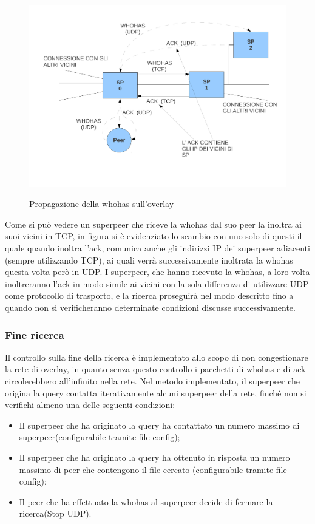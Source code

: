 \begin{figure}[htpb]
\centering
{\includegraphics[width=12cm]{img/whhs_sull_overlay}}
\caption{Propagazione della whohas sull'overlay\label{whhs_overlay}}
\end{figure}



Come si può vedere un superpeer che riceve la whohas dal suo peer la inoltra ai suoi vicini in TCP, in figura si è evidenziato lo scambio con uno solo di questi il quale quando inoltra l'ack, comunica anche gli indirizzi IP dei superpeer adiacenti (sempre utilizzando TCP), ai quali verrà successivamente inoltrata la whohas questa volta però in UDP.\linebreak
I superpeer, che hanno ricevuto la whohas, a loro volta inoltreranno l'ack in modo simile ai vicini con la sola differenza di utilizzare UDP come protocollo di trasporto, e la ricerca proseguirà nel modo descritto fino a quando non si verificheranno determinate condizioni discusse successivamente.     

\subsubsection{Fine ricerca}
Il controllo sulla fine della ricerca è implementato allo scopo di non congestionare la rete di overlay, in quanto senza questo controllo i pacchetti di whohas e di ack circolerebbero all'infinito nella rete. Nel metodo implementato, il superpeer che origina la query contatta iterativamente alcuni superpeer della rete, finché non si verifichi almeno una delle seguenti condizioni:\linebreak
\begin{itemize}
\item Il superpeer che ha originato la query ha contattato un numero massimo di superpeer(configurabile tramite file config);
\item Il superpeer che ha originato la query ha ottenuto in risposta un numero massimo di peer che contengono il file cercato (configurabile tramite file config);
\item Il peer che ha effettuato la whohas al superpeer decide di fermare la ricerca(Stop UDP). 
\end{itemize}

